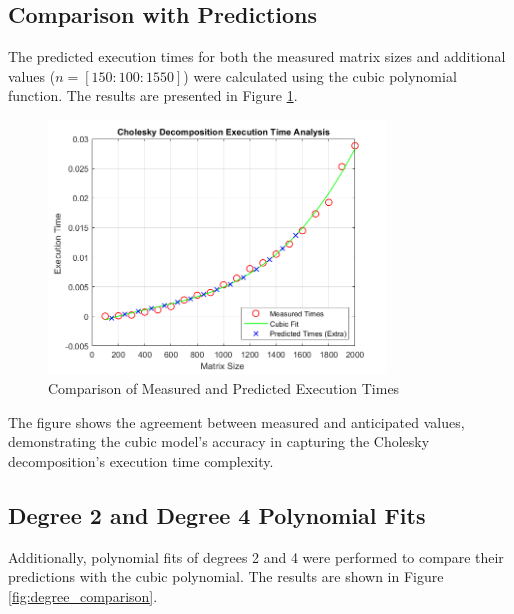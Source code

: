 \newpage
\subsection*{Comparison with Predictions}

The predicted execution times for both the measured matrix sizes and additional values ($n = [150:100:1550]$) were calculated using the cubic polynomial function. The results are presented in Figure \ref{fig:prediction_comparison}.
\begin{figure}[ht]
    \centering
    \includegraphics[width=0.8\textwidth]{Chapters/cholesky time analysis.png}
    \caption{Comparison of Measured and Predicted Execution Times}
    \label{fig:prediction_comparison}
\end{figure}
\newline
The figure shows the agreement between measured and anticipated values, demonstrating the cubic model's accuracy in capturing the Cholesky decomposition's execution time complexity.

\newpage
\subsection*{Degree 2 and Degree 4 Polynomial Fits}

Additionally, polynomial fits of degrees 2 and 4 were performed to compare their predictions with the cubic polynomial. The results are shown in Figure \ref{fig:degree_comparison}.

